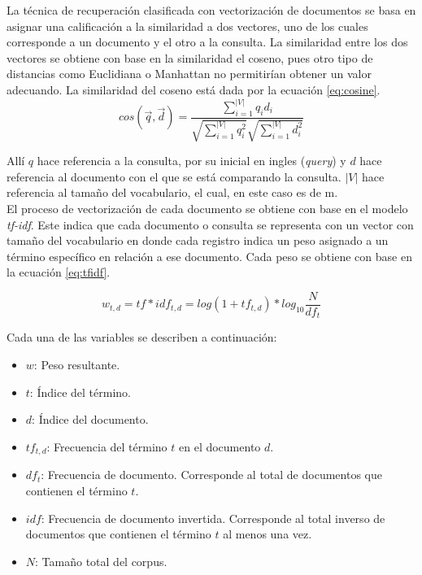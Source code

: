 La técnica de recuperación clasificada con vectorización de documentos se basa en asignar una calificación a la similaridad a dos vectores, uno de los cuales corresponde a un documento y el otro a la consulta. La similaridad entre los dos vectores se obtiene con base en la similaridad el coseno, pues otro tipo de distancias como Euclidiana o Manhattan no permitirían obtener un valor adecuando. La similaridad del coseno está dada por la ecuación \ref{eq:cosine}.
\begin{equation}
    cos(\vec{q}, \vec{d}) = \frac{\sum_{i=1}^{|V|}q_id_i}{\sqrt{\sum_{i=1}^{|V|}q_i^2} \sqrt{\sum_{i=1}^{|V|}d_i^2}}
    \label{eq:cosine}
\end{equation}

Allí $q$ hace referencia a la consulta, por su inicial en ingles (\textit{query}) y $d$ hace referencia al documento con el que se está comparando la consulta. $|V|$ hace referencia al tamaño del vocabulario, el cual, en este caso es de m.\\

El proceso de vectorización de cada documento se obtiene con base en el modelo \textit{tf-idf}. Este indica que cada documento o consulta se representa con un vector con tamaño del vocabulario en donde cada registro indica un peso asignado a un término específico en relación a ese documento. Cada peso se obtiene con base en la ecuación \ref{eq:tfidf}.

\begin{equation}
    w_{t,d} = tf * idf_{t,d} = log(1 + tf_{t,d}) * log_{10}\frac{N}{df_t}
    \label{eq:tfidf}
\end{equation}

Cada una de las variables se describen a continuación:
\begin{itemize}
    \item $w$: Peso resultante.
    \item $t$: Índice del término.
    \item $d$: Índice del documento.
    \item $tf_{t,d}$: Frecuencia del término $t$ en el documento $d$.
    \item $df_{t}$: Frecuencia de documento. Corresponde al total de documentos que contienen el término $t$. 
    \item $idf$: Frecuencia de documento invertida. Corresponde al total inverso de documentos que contienen el término $t$ al menos una vez.
    \item $N$: Tamaño total del corpus.
\end{itemize}

